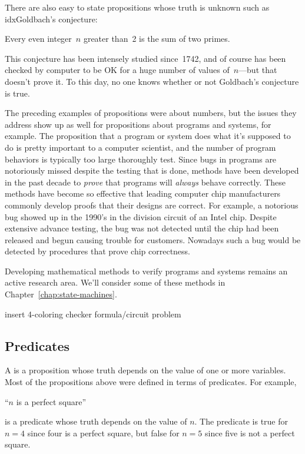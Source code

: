 There are also easy to state propositions whose truth is unknown such
as idx{Goldbach's conjecture}:
\begin{proposition}[Goldbach]
Every even integer~$n$ greater than~2 is the sum of two primes.
\end{proposition}
This conjecture has been intensely studied since~1742, and of course
has been checked by computer to be OK for a huge number of values
of~$n$---but that doesn't prove it.  To this day, no one knows whether
or not Goldbach's conjecture is true.

The preceding examples of propositions were about numbers, but the
issues they address show up as well for propositions about programs
and systems, for example.  The proposition that a program or system
does what it's supposed to do is pretty important to a computer
scientist, and the number of program behaviors is typically too large
thoroughly test.  Since bugs in programs are notoriously missed
despite the testing that is done, methods have been developed in the
past decade to \emph{prove} that programs will \emph{always} behave
correctly.  These methods have become so effective that leading
computer chip manufacturers commonly develop proofs that their designs
are correct.  For example, a notorious bug showed up in the 1990's in
the division circuit of an Intel chip.  Despite extensive advance
testing, the bug was not detected until the chip had been released and
begun causing trouble for customers.  Nowadays such a bug would be
detected by procedures that prove chip correctness.

Developing mathematical methods to verify programs and systems remains
an active research area.  We'll consider some of these methods in
Chapter~\ref{chap:state-machines}.

\begin{problems}

\homeworkproblems
\begin{editingnotes}
insert 4-coloring checker formula/circuit problem
\end{editingnotes}

\end{problems}

\subsection{Predicates}
A  is a proposition whose truth depends on the value of
one or more variables.  Most of the propositions above were defined in
terms of predicates.  For example,
%
\begin{center}
``$n$ is a perfect square''
\end{center}
%
is a predicate whose truth depends on the value of $n$.  The predicate is
true for $n = 4$ since four is a perfect square, but false for $n = 5$
since five is not a perfect square.

